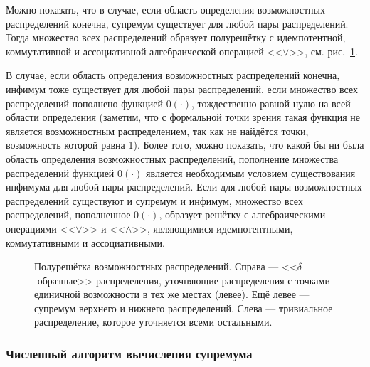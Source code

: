 Можно показать, что в случае, если область определения возможностных распределений конечна, супремум существует для любой пары распределений.  Тогда множество всех распределений образует полурешётку с идемпотентной, коммутативной и ассоциативной алгебраической операцией <<$\vee$>>, см. рис.~\ref{ris:half_lattice}. 
\begin{notice}
В случае, если область определения возможностных распределений конечна, инфимум тоже существует для любой пары распределений, если множество всех распределений пополнено функцией $0(\cdot)$, тождественно равной нулю на всей области определения (заметим, что с формальной точки зрения такая функция не является возможностным распределением, так как не найдётся точки, возможность которой равна 1). Более того, можно показать, что какой бы ни была область определения возможностных распределений, пополнение множества распределений функцией $0(\cdot)$ является необходимым условием существования инфимума для любой пары распределений. Если для любой пары возможностных распределений существуют и супремум и инфимум, множество всех распределений, пополненное $0(\cdot)$, образует решётку с алгебраическими операциями <<$\vee$>> и <<$\wedge$>>, являющимися идемпотентными, коммутативными и ассоциативными.
\end{notice}

\begin{figure}[h]
\caption{\small Полурешётка возможностных распределений. Справа --- <<$\delta$-образные>> распределения, уточняющие распределения с точками единичной возможности в тех же местах (левее). Ещё левее --- супремум верхнего и нижнего распределений. Слева --- тривиальное распределение, которое уточняется всеми остальными. }
\label{ris:half_lattice}
\end{figure}

\subsubsection{Численный алгоритм вычисления супремума}
\label{algo_sup_poss}

